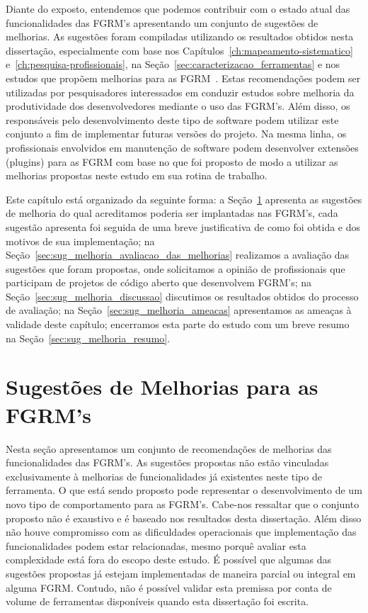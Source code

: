 Diante do exposto, entendemos que podemos contribuir com o estado a\-tu\-al das
funcionalidades das FGRM's apresentando um conjunto de sugestões de melhorias.
As sugestões foram compiladas utilizando os resultados obtidos nesta
dissertação, especialmente com base nos
Capítulos~\ref{ch:mapeamento-sistematico} e~\ref{ch:pesquisa-profissionais}, na
Seção~\ref{sec:caracterizacao_ferramentas} e nos estudos que propõem melhorias
para as FGRM~\cite{zimmermann2009improving, bettenburg2008makes, singh2011bug}.
Estas recomendações podem ser utilizadas por pesquisadores interessados em
conduzir estudos sobre melhoria da produtividade dos desenvolvedores mediante o
uso das FGRM's. Além disso, os responsáveis pelo desenvolvimento deste tipo de
software podem utilizar este conjunto a fim de implementar futuras versões do
projeto. Na mesma linha, os profissionais envolvidos em manutenção de software
podem desenvolver extensões (plugins) para as FGRM com base no que foi proposto
de modo a utilizar as melhorias propostas neste estudo em sua rotina de
trabalho.

Este capítulo está organizado da seguinte forma: a
Seção~\ref{sec:sug_melhoria_melhorando_as_ferraementas} apresenta as sugestões
de melhoria do qual acreditamos poderia ser implantadas nas FGRM's, cada
sugestão apresenta foi seguida de uma breve justificativa de como foi obtida e
dos motivos de sua implementação; na
Seção~\ref{sec:sug_melhoria_avaliacao_das_melhorias} realizamos a avaliação das
sugestões que foram propostas, onde solicitamos a opinião de profissionais que
participam de projetos de código aberto que desenvolvem FGRM's; na
Seção~\ref{sec:sug_melhoria_discussao} discutimos os resultados obtidos do
processo de avaliação; na Seção~\ref{sec:sug_melhoria_ameacas} apresentamos as
ameaças à validade deste capítulo; encerramos esta parte do estudo com um breve
resumo na Seção~\ref{sec:sug_melhoria_resumo}.

\section{Sugestões de Melhorias para as FGRM's}
\label{sec:sug_melhoria_melhorando_as_ferraementas}

Nesta seção apresentamos um conjunto de recomendações de melhorias das
funcionalidades das FGRM's. As sugestões propostas não estão vinculadas
exclusivamente à melhorias de funcionalidades já existentes neste tipo de
ferramenta. O que está sendo proposto pode representar o desenvolvimento de um
novo tipo de comportamento para as FGRM's. Cabe-nos ressaltar que o conjunto
proposto não é exaustivo e é baseado nos resultados desta dissertação. Além
disso não houve compromisso com as dificuldades operacionais que implementação
das funcionalidades podem estar relacionadas, mesmo porquê avaliar esta
complexidade está fora do escopo deste estudo. É possível que algumas das
su\-ges\-tões propostas já estejam implementadas de maneira parcial ou integral
em alguma FGRM\@.  Contudo, não é possível validar esta premissa por conta de
volume de ferramentas disponíveis quando esta dissertação foi escrita.

